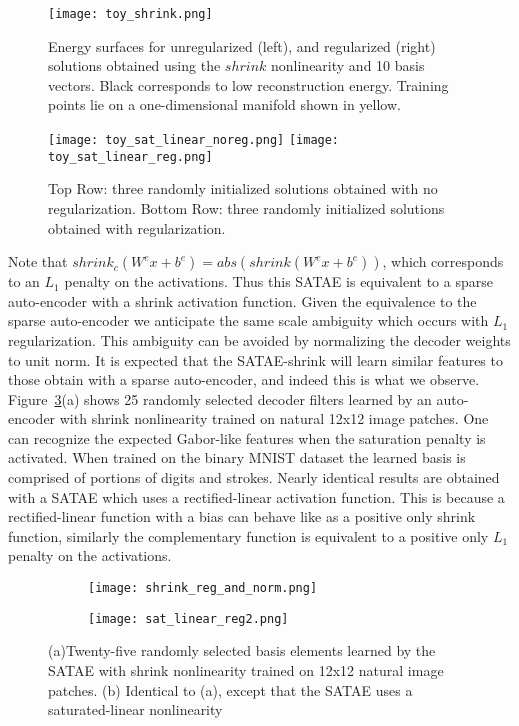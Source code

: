 \documentclass{article} %
\begin{document}
\begin{figure}
\centering 
\texttt{[image: toy\_shrink.png]}
\caption{Energy surfaces for unregularized (left), and regularized (right) solutions obtained using the $shrink$ nonlinearity and 10 basis vectors. Black corresponds to low reconstruction energy. Training points lie on a one-dimensional manifold shown in yellow.}  
\label{fig:toyshrink}
\end{figure} 

\begin{figure}
\centering 
\texttt{[image: toy\_sat\_linear\_noreg.png]}
\texttt{[image: toy\_sat\_linear\_reg.png]}
\caption{Top Row: three randomly initialized solutions obtained with no regularization. Bottom Row: three randomly initialized solutions obtained with regularization.}  
\label{fig:toysatlinear} 
\end{figure} 

Note that $shrink_c(W^e x + b^e) =  abs(shrink(W^e x + b^e))$, which corresponds to an $L_1$ penalty on the activations. Thus this SATAE is equivalent to a sparse auto-encoder with a shrink activation function. Given the equivalence to the sparse auto-encoder we anticipate the same scale ambiguity which occurs with $L_1$ regularization. This ambiguity can be avoided by normalizing the decoder weights to unit norm. It is expected that the SATAE-shrink will learn similar features to those obtain with a sparse auto-encoder, and indeed this is what we observe. Figure~\ref{fig:patches}(a) shows 25 randomly selected decoder filters learned by an auto-encoder with shrink nonlinearity trained on natural 12x12 image patches. One can recognize the expected Gabor-like features when the saturation penalty is activated. When trained on the binary MNIST dataset the learned basis is comprised of portions of digits and strokes. Nearly identical results are obtained with a SATAE which uses a rectified-linear activation function. This is because a rectified-linear function with a bias can behave like as a positive only shrink function, similarly the complementary function is equivalent to a positive only $L_1$ penalty on the activations.          

\begin{figure}
\centering
	\begin{subfigure}[b]{0.2\textwidth}
		\centering 
		\texttt{[image: shrink\_reg\_and\_norm.png]}
		\caption{}
	\end{subfigure} 
	\begin{subfigure}[b]{0.2\textwidth}
		\centering 
		\texttt{[image: sat\_linear\_reg2.png]}
		\caption{}
	\end{subfigure} 
\caption{(a)Twenty-five randomly selected basis elements learned by the SATAE with shrink nonlinearity trained on 12x12 natural image patches. (b) Identical to (a), except that the SATAE uses a saturated-linear nonlinearity}
\label{fig:patches}
\end{figure} 
\end{document}

